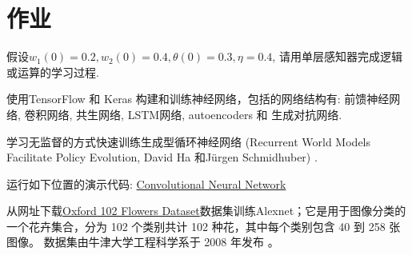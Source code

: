 \section{作业}
\begin{think}
    假设$w_1 (0)=0.2, w_2 (0)=0.4, \theta (0)=0.3, \eta=0.4$, 请用单层感知器完成逻辑或运算的学习过程.
\end{think}
\begin{think}
使用TensorFlow 和 Keras 构建和训练神经网络，包括的网络结构有: 前馈神经网络, 卷积网络, 共生网络, LSTM网络, autoencoders 和 生成对抗网络.
\end{think}
\begin{think}
    学习无监督的方式快速训练生成型循环神经网络 (Recurrent World Models Facilitate Policy Evolution, David Ha 和Jürgen Schmidhuber) \cite{ha2018worldmodels}.
\end{think}
\begin{think}
    运行如下位置的演示代码: \href{https://colab.research.google.com/drive/16a3G7Hh8Pv1X1PhZAUBEnZEkXThzDeHJ#scrollTo=D_a2USyd4giE}{Convolutional Neural Network}
\end{think}
\begin{think}
  从网址下载\href{https://hyper.ai/datasets/5458}{Oxford 102 Flowers Dataset}数据集训练Alexnet；它是用于图像分类的一个花卉集合，分为 102 个类别共计 102 种花，其中每个类别包含 40 到 258 张图像。
数据集由牛津大学工程科学系于 2008 年发布 \cite{Nilsback2008flowers}。
\end{think}